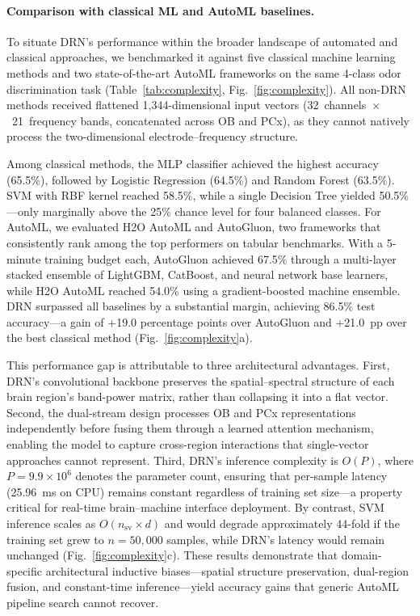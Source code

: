 
\paragraph{Comparison with classical ML and AutoML baselines.}
To situate DRN's performance within the broader landscape of automated and
classical approaches, we benchmarked it against five classical machine
learning methods and two state-of-the-art AutoML frameworks on the same
4-class odor discrimination task (Table~\ref{tab:complexity},
Fig.~\ref{fig:complexity}).
All non-DRN methods received flattened 1,344-dimensional input vectors
(32~channels~$\times$~21~frequency bands, concatenated across OB and PCx),
as they cannot natively process the two-dimensional electrode--frequency
structure.

Among classical methods, the MLP classifier achieved the highest accuracy
(65.5\%), followed by Logistic Regression (64.5\%) and Random Forest
(63.5\%). SVM with RBF kernel reached 58.5\%, while a single Decision Tree
yielded 50.5\%---only marginally above the 25\% chance level for four
balanced classes. For AutoML, we evaluated H2O AutoML and AutoGluon, two
frameworks that consistently rank among the top performers on tabular
benchmarks. With a 5-minute training budget each, AutoGluon achieved 67.5\%
through a multi-layer stacked ensemble of LightGBM, CatBoost, and neural
network base learners, while H2O AutoML reached 54.0\% using a
gradient-boosted machine ensemble. DRN surpassed all baselines by a
substantial margin, achieving 86.5\% test accuracy---a gain of +19.0
percentage points over AutoGluon and +21.0~pp over the best classical method
(Fig.~\ref{fig:complexity}a).

This performance gap is attributable to three architectural advantages.
First, DRN's convolutional backbone preserves the spatial--spectral structure
of each brain region's band-power matrix, rather than collapsing it into a
flat vector. Second, the dual-stream design processes OB and PCx
representations independently before fusing them through a learned attention
mechanism, enabling the model to capture cross-region interactions that
single-vector approaches cannot represent. Third, DRN's inference complexity
is $O(P)$, where $P = 9.9 \times 10^6$ denotes the parameter count,
ensuring that per-sample latency (25.96~ms on CPU) remains constant
regardless of training set size---a property critical for real-time
brain--machine interface deployment. By contrast, SVM inference scales as
$O(n_{\text{sv}} \times d)$ and would degrade approximately 44-fold if the
training set grew to $n = 50{,}000$ samples, while DRN's latency would
remain unchanged (Fig.~\ref{fig:complexity}c). These results demonstrate
that domain-specific architectural inductive biases---spatial structure
preservation, dual-region fusion, and constant-time inference---yield
accuracy gains that generic AutoML pipeline search cannot recover.
